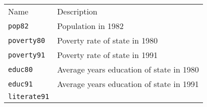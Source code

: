 \documentclass[]{article}
\begin{document}
\begin{longtable}[c]{@{}ll@{}}
\toprule\addlinespace
\begin{minipage}[b]{0.24\columnwidth}\raggedright
Name
\end{minipage} & \begin{minipage}[b]{0.69\columnwidth}\raggedright
Description
\end{minipage}
\\\addlinespace
\midrule\endhead
\begin{minipage}[t]{0.24\columnwidth}\raggedright
\texttt{pop82}
\end{minipage} & \begin{minipage}[t]{0.69\columnwidth}\raggedright
Population in 1982
\end{minipage}
\\\addlinespace
\begin{minipage}[t]{0.24\columnwidth}\raggedright
\texttt{poverty80}
\end{minipage} & \begin{minipage}[t]{0.69\columnwidth}\raggedright
Poverty rate of state in 1980
\end{minipage}
\\\addlinespace
\begin{minipage}[t]{0.24\columnwidth}\raggedright
\texttt{poverty91}
\end{minipage} & \begin{minipage}[t]{0.69\columnwidth}\raggedright
Poverty rate of state in 1991
\end{minipage}
\\\addlinespace
\begin{minipage}[t]{0.24\columnwidth}\raggedright
\texttt{educ80}
\end{minipage} & \begin{minipage}[t]{0.69\columnwidth}\raggedright
Average years education of state in 1980
\end{minipage}
\\\addlinespace
\begin{minipage}[t]{0.24\columnwidth}\raggedright
\texttt{educ91}
\end{minipage} & \begin{minipage}[t]{0.69\columnwidth}\raggedright
Average years education of state in 1991
\end{minipage}
\\\addlinespace
\begin{minipage}[t]{0.24\columnwidth}\raggedright
\texttt{literate91}
\end{minipage} & \begin{minipage}[t]{0.69\columnwidth}\raggedright

\end{minipage}
\end{longtable}
\end{document}
